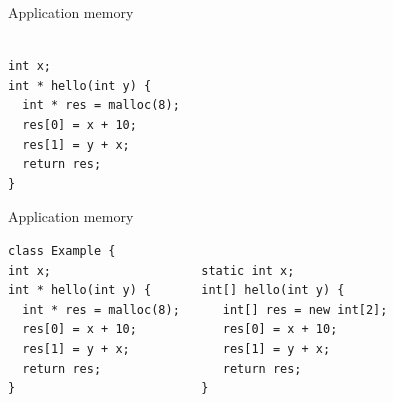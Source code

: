 \documentclass{beamer}
\begin{document}
\begin{frame}[fragile]{Application memory}
\begin{Verbatim}[fontsize=\small]

int x;
int * hello(int y) {
  int * res = malloc(8);
  res[0] = x + 10;
  res[1] = y + x;
  return res;
}
\end{Verbatim}
\end{frame}

\begin{frame}[fragile]{Application memory}
\begin{Verbatim}[fontsize=\small]
                        class Example {
int x;                     static int x;
int * hello(int y) {       int[] hello(int y) {
  int * res = malloc(8);      int[] res = new int[2];
  res[0] = x + 10;            res[0] = x + 10;
  res[1] = y + x;             res[1] = y + x;
  return res;                 return res;
}                          }
\end{Verbatim}
\end{frame}
\end{document}
